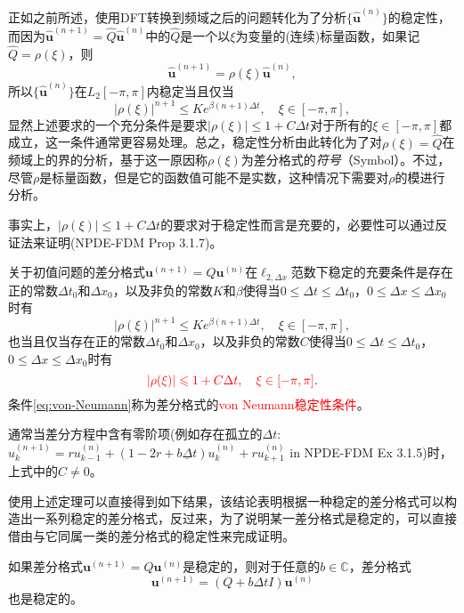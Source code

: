 \documentclass[a4paper,10pt]{ctexart}
\begin{document}
正如之前所述，使用DFT转换到频域之后的问题转化为了分析$ \{\hat{\bm{u}}^{(n)}\} $的稳定性，而因为$ \hat{\bm{u}}^{(n+1)} = \hat{Q} \hat{\bm{u}}^{(n)} $中的$ \hat{Q} $是一个以$ \xi $为变量的(连续)标量函数，如果记$ \hat{Q} = \rho(\xi) $，则
\[
    \hat{\bm{u}}^{(n+1)} = \rho(\xi) \hat{\bm{u}}^{(n)},
\]
所以$ \{\hat{\bm{u}}^{(n)}\} $在$ L_2[-\pi,\pi] $内稳定当且仅当
\begin{equation}
    | \rho(\xi) |^{n+1} \leqslant Ke^{\beta (n+1)\Delta t},\quad \xi\in [-\pi,\pi],
\end{equation}
显然上述要求的一个充分条件是要求$ |\rho(\xi)|\leqslant 1+C \Delta t $对于所有的$ \xi\in [-\pi,\pi] $都成立，这一条件通常更容易处理。总之，稳定性分析由此转化为了对$ \rho(\xi) = \hat{Q} $在频域上的界的分析，基于这一原因称$ \rho(\xi) $为差分格式的\emph{符号}（Symbol）。不过，尽管$ \rho $是标量函数，但是它的函数值可能不是实数，这种情况下需要对$ \rho $的模进行分析。

事实上，$ |\rho(\xi)|\leqslant 1+C \Delta t $的要求对于稳定性而言是充要的，必要性可以通过反证法来证明(NPDE-FDM Prop 3.1.7)。
\begin{theorem}
    关于初值问题的差分格式$ \bm{u}^{(n+1)} = Q \bm{u}^{(n)} $在$ \ell_{2,\Delta x} $范数下稳定的充要条件是存在正的常数$ \Delta t_0 $和$ \Delta x_0 $，以及非负的常数$ K $和$ \beta $使得当$ 0\leqslant \Delta t \leqslant \Delta t_0 $，$ 0\leqslant \Delta x\leqslant \Delta x_0 $时有
    \begin{equation}
        | \rho(\xi) |^{n+1} \leqslant Ke^{\beta (n+1)\Delta t},\quad \xi\in [-\pi,\pi],
    \end{equation}
    也当且仅当存在正的常数$ \Delta t_0 $和$ \Delta x_0 $，以及非负的常数$ C $使得当$ 0\leqslant \Delta t\leqslant \Delta t_0 $，$ 0\leqslant \Delta x\leqslant \Delta x_0 $时有
    \begin{equation}\label{eq:von-Neumann}
        \textcolor{red}{| \rho(\xi) | \leqslant 1+C \Delta t,\quad \xi\in [-\pi,\pi]}.
    \end{equation}
    条件\eqref{eq:von-Neumann}称为差分格式的\textcolor{red}{von Neumann稳定性条件}。
\end{theorem}
\noindent 通常当差分方程中含有零阶项(例如存在孤立的$ \Delta t $: $ u_k^{(n+1)} = ru_{k-1}^{(n)}+(1-2r+\underline{b\Delta t})u^{(n)}_k +ru_{k+1}^{(n)} $ in NPDE-FDM Ex 3.1.5)时，上式中的$ C\ne 0 $。

使用上述定理可以直接得到如下结果，该结论表明根据一种稳定的差分格式可以构造出一系列稳定的差分格式，反过来，为了说明某一差分格式是稳定的，可以直接借由与它同属一类的差分格式的稳定性来完成证明。
\begin{proposition}
    如果差分格式$ \bm{u}^{(n+1)} = Q \bm{u}^{(n)} $是稳定的，则对于任意的$ b\in \mathbb{C} $，差分格式
    \[
        \bm{u}^{(n+1)} = (Q+b \Delta t I) \bm{u}^{(n)}
    \]
    也是稳定的。
\end{proposition}
\end{document}
